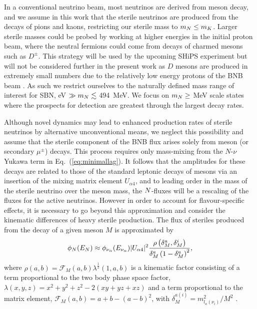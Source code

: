 \documentclass[11pt, a4paper]{article}
\newcommand{\refeq}[1]{Eq.~(\ref{#1})}
\def\ster{\ensuremath N}
\begin{document}
In a conventional neutrino beam, most neutrinos are derived from meson decay,
and we assume in this work that the sterile neutrinos are produced from the
decays of pions and kaons, restricting our sterile mass to $m_\ster \le m_K$.
%
Larger sterile masses could be probed by working at higher energies in the
initial proton beam, where the neutral fermions could come from decays of
charmed mesons such as $D^\pm$. This strategy will be used by the upcoming
SHiPS experiment \cite{Alekhin:2015byh, Anelli:2015pba} but will not be
considered further in the present work as $D$ mesons are produced in extremely
small numbers due to the relatively low energy protons of the BNB beam
\cite{AguilarArevalo:2008yp}. As such we restrict ourselves to the naturally
defined mass range of interest for SBN, eV $\gg m_\ster \lesssim$ 494~MeV.  We
focus on $m_\ster \geq$ MeV scale states where the prospects for detection are
greatest through the largest decay rates.

%
Although novel dynamics may lead to enhanced production rates of sterile
neutrinos by alternative unconventional means, we neglect this possibility and
assume that the sterile component of the BNB flux arises solely from meson (or
secondary $\mu^\pm$) decays. This process requires only mass-mixing from the
$N$-$\nu$ Yukawa term in \refeq{eq:minimallag}. It follows that the amplitudes
for these decays are related to those of the standard leptonic decays of mesons
via an insertion of the mixing matrix element $U_{\alpha 4}$, and to leading
order in the mass of the sterile neutrino over the meson mass, the
$\ster$-fluxes will be a rescaling of the fluxes for the active neutrinos. 
%
However in order to account for flavour-specific effects, it is necessary to go
beyond this approximation and consider the kinematic differences of heavy
sterile production.
%
The flux of steriles produced from the decay of a given meson $M$ is
approximated by
%
\[ \phi_{\ster}(E_{\ster}) \approx \phi_{\nu_\alpha} (E_{\nu_\alpha})\vert
U_{\alpha 4}\vert^2 \frac{\rho\left( \delta_M^a , \delta_M^i
\right)}{\delta_M^a \left(1- \delta_M^a\right)^2},  \]
%
where $\rho(a,b)=\mathcal{F}_M(a,b) \lambda^{\frac{1}{2}}(1,a,b)$ is a
kinematic factor consisting of a term proportional to the two body phase space
factor, $\lambda(x,y,z)=x^2+y^2+z^2-2(x y+yz+x z)$ and a term proportional to
the matrix element, $\mathcal{F}_M(a,b)= a+b -\left(a-b\right)^2$, with
$\delta_M^{a(i)}=m_{l_a(\nu_i)}^2/M^2$ \cite{PhysRevD.24.1232}. 
\end{document}
